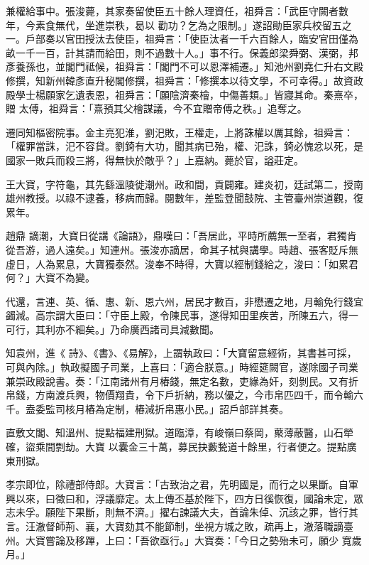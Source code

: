 \begin{pinyinscope}
 兼權給事中。張浚薨，其家奏留使臣五十餘人理資任，祖舜言：「武臣守闕者數年，今素食無代，坐進崇秩，曷以
 勸功？乞為之限制。」遂詔勛臣家兵校留五之一。戶部奏以官田授汰去使臣，祖舜言：「使臣汰者一千六百餘人，臨安官田僅為畝一千一百，計其請而給田，則不過數十人。」事不行。保義郎梁舜弼、漢弼，邦彥養孫也，並閣門祗候，祖舜言：「閣門不可以恩澤補遷。」知池州劉堯仁升右文殿修撰，知新州韓彥直升秘閣修撰，祖舜言：「修撰本以待文學，不可幸得。」故資政殿學士楊願家乞遺表恩，祖舜言：「願陰濟秦檜，中傷善類。」皆寢其命。秦熹卒，贈
 太傅，祖舜言：「熹預其父檜謀議，今不宜贈帝傅之秩。」追奪之。



 遷同知樞密院事。金主亮犯淮，劉汜敗，王權走，上將誅權以厲其餘，祖舜言：「權罪當誅，汜不容貸。劉錡有大功，聞其病已殆，權、汜誅，錡必愧忿以死，是國家一敗兵而殺三將，得無快於敵乎？」上嘉納。薨於官，謚莊定。



 王大寶，字符龜，其先繇溫陵徙潮州。政和間，貢闢雍。建炎初，廷試第二，授南雄州教授。以祿不逮養，移病而歸。閱數年，差監登聞鼓院、主管臺州崇道觀，復累年。



 趙鼎
 謫潮，大寶日從講《論語》，鼎嘆曰：「吾居此，平時所薦無一至者，君獨肯從吾游，過人遠矣。」知連州。張浚亦謫居，命其子栻與講學。時趙、張客貶斥無虛日，人為累息，大寶獨泰然。浚奉不時得，大寶以經制錢給之，浚曰：「如累君何？」大寶不為變。



 代還，言連、英、循、惠、新、恩六州，居民才數百，非懋遷之地，月輸免行錢宜蠲減。高宗謂大臣曰：「守臣上殿，令陳民事，遂得知田里疾苦，所陳五六，得一可行，其利亦不細矣。」乃命廣西諸司具減數聞。



 知袁州，進《
 詩》、《書》、《易解》，上謂執政曰：「大寶留意經術，其書甚可採，可與內除。」執政擬國子司業，上喜曰：「適合朕意。」時經筵闕官，遂除國子司業兼崇政殿說書。奏：「江南諸州有月樁錢，無定名數，吏緣為奸，刻剝民。又有折帛錢，方南渡兵興，物價翔貴，令下戶折納，務以優之，今市帛匹四千，而令輸六千。盍委監司核月樁為定制，樁減折帛惠小民。」詔戶部詳其奏。



 直敷文閣、知溫州、提點福建刑獄。道臨漳，有峻嶺曰蔡岡，藂薄蔽醫，山石犖確，盜乘間剽劫。大寶
 以囊金三十萬，募民抉藪甃道十餘里，行者便之。提點廣東刑獄。



 孝宗即位，除禮部侍郎。大寶言：「古致治之君，先明國是，而行之以果斷。自軍興以來，曰徵曰和，浮議靡定。太上傳丕基於陛下，四方日徯恢復，國論未定，眾志未孚。願陛下果斷，則無不濟。」擢右諫議大夫，首論朱倬、沉該之罪，皆行其言。汪澈督師荊、襄，大寶劾其不能節制，坐視方城之敗，疏再上，澈落職謫臺州。大寶嘗論及移蹕，上曰：「吾欲亟行。」大寶奏：「今日之勢殆未可，願少
 寬歲月。」




\end{pinyinscope}

